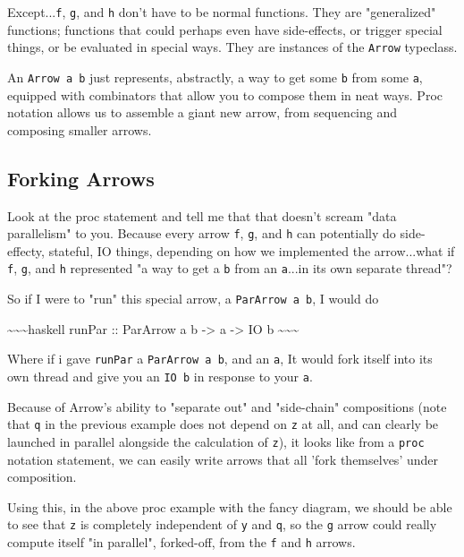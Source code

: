 \documentclass[]{article}
\begin{document}
Except...\texttt{f}, \texttt{g}, and \texttt{h} don't have to be normal
functions. They are "generalized" functions; functions that could perhaps even
have side-effects, or trigger special things, or be evaluated in special ways.
They are instances of the \texttt{Arrow} typeclass.

An \texttt{Arrow\ a\ b} just represents, abstractly, a way to get some
\texttt{b} from some \texttt{a}, equipped with combinators that allow you to
compose them in neat ways. Proc notation allows us to assemble a giant new
arrow, from sequencing and composing smaller arrows.

\subsection{Forking Arrows}

Look at the proc statement and tell me that that doesn't scream "data
parallelism" to you. Because every arrow \texttt{f}, \texttt{g}, and \texttt{h}
can potentially do side-effecty, stateful, IO things, depending on how we
implemented the arrow...what if \texttt{f}, \texttt{g}, and \texttt{h}
represented "a way to get a \texttt{b} from an \texttt{a}...in its own separate
thread"?

So if I were to "run" this special arrow, a \texttt{ParArrow\ a\ b}, I would do

\textasciitilde{}\textasciitilde{}\textasciitilde{}haskell runPar :: ParArrow a
b -\textgreater{} a -\textgreater{} IO b
\textasciitilde{}\textasciitilde{}\textasciitilde{}

Where if i gave \texttt{runPar} a \texttt{ParArrow\ a\ b}, and an \texttt{a}, It
would fork itself into its own thread and give you an \texttt{IO\ b} in response
to your \texttt{a}.

Because of Arrow's ability to "separate out" and "side-chain" compositions (note
that \texttt{q} in the previous example does not depend on \texttt{z} at all,
and can clearly be launched in parallel alongside the calculation of
\texttt{z}), it looks like from a \texttt{proc} notation statement, we can
easily write arrows that all 'fork themselves' under composition.

Using this, in the above proc example with the fancy diagram, we should be able
to see that \texttt{z} is completely independent of \texttt{y} and \texttt{q},
so the \texttt{g} arrow could really compute itself "in parallel", forked-off,
from the \texttt{f} and \texttt{h} arrows.
\end{document}
